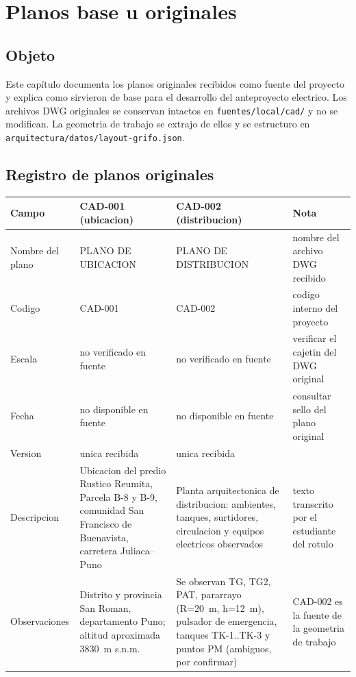 \chapter{Planos base u originales}

\section{Objeto}
Este capítulo documenta los planos originales recibidos como fuente del
proyecto y explica como sirvieron de base para el desarrollo del anteproyecto
electrico. Los archivos DWG originales se conservan intactos en
\texttt{fuentes/local/cad/} y no se modifican. La geometria de trabajo se
extrajo de ellos y se estructuro en
\texttt{arquitectura/datos/layout-grifo.json}.

\section{Registro de planos originales}

\begin{center}
\small
\begin{tabularx}{\linewidth}{@{}l p{3.4cm} p{3.4cm} X@{}}
\toprule
Campo & CAD-001 (ubicacion) & CAD-002 (distribucion) & Nota \\
\midrule
Nombre del plano & PLANO DE UBICACION & PLANO DE DISTRIBUCION &
  nombre del archivo DWG recibido \\
Codigo & CAD-001 & CAD-002 & codigo interno del proyecto \\
Escala & no verificado en fuente & no verificado en fuente &
  verificar el cajetin del DWG original \\
Fecha & no disponible en fuente & no disponible en fuente &
  consultar sello del plano original \\
Version & unica recibida & unica recibida & \\
Descripcion & Ubicacion del predio Rustico Reumita, Parcela B-8 y B-9, comunidad
  San Francisco de Buenavista, carretera Juliaca--Puno & Planta arquitectonica
  de distribucion: ambientes, tanques, surtidores, circulacion y equipos
  electricos observados &
  texto transcrito por el estudiante del rotulo \\
Observaciones & Distrito y provincia San Roman, departamento Puno; altitud
  aproximada 3830~m s.n.m. & Se observan TG, TG2, PAT, pararrayo (R=20~m,
  h=12~m), pulsador de emergencia, tanques TK-1..TK-3 y puntos PM (ambiguos,
  por confirmar) &
  CAD-002 es la fuente de la geometria de trabajo \\
\bottomrule
\end{tabularx}
\end{center}

